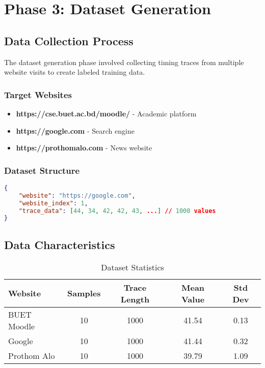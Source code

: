 \documentclass[11pt,a4paper]{article}
\begin{document}
\section{Phase 3: Dataset Generation}

\subsection{Data Collection Process}
The dataset generation phase involved collecting timing traces from multiple website visits to create labeled training data.

\subsubsection{Target Websites}
\begin{itemize}
    \item \textbf{https://cse.buet.ac.bd/moodle/} - Academic platform
    \item \textbf{https://google.com} - Search engine
    \item \textbf{https://prothomalo.com} - News website
\end{itemize}

\subsubsection{Dataset Structure}
\begin{lstlisting}[language=json,caption=Dataset Entry Format]
{
    "website": "https://google.com",
    "website_index": 1,
    "trace_data": [44, 34, 42, 42, 43, ...] // 1000 values
}
\end{lstlisting}

\subsection{Data Characteristics}
\begin{table}[H]
\centering
\caption{Dataset Statistics}
\label{tab:dataset}
\begin{tabular}{@{}lcccc@{}}
\toprule
Website & Samples & Trace Length & Mean Value & Std Dev \\
\midrule
BUET Moodle & 10 & 1000 & 41.54 & 0.13 \\
Google & 10 & 1000 & 41.44 & 0.32 \\
Prothom Alo & 10 & 1000 & 39.79 & 1.09 \\
\bottomrule
\end{tabular}
\end{table}
\end{document}
